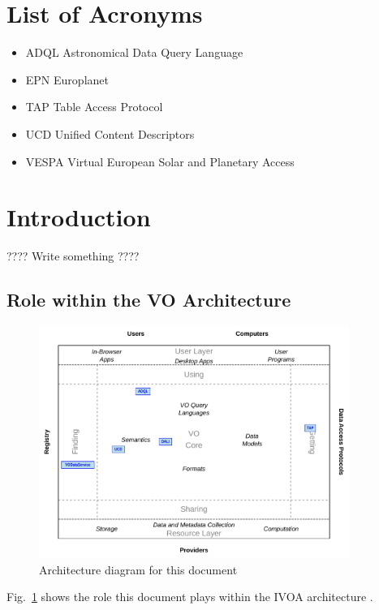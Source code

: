 \documentclass[11pt,a4paper]{ivoa}
\begin{document}
\section*{List of Acronyms}
\begin{itemize}
\item{ADQL} Astronomical Data Query Language
\item{EPN} Europlanet
\item{TAP} Table Access Protocol 
\item{UCD} Unified Content Descriptors
\item{VESPA} Virtual European Solar and Planetary Access
\end{itemize}

\section{Introduction}

???? Write something ????

\subsection{Role within the VO Architecture}

\begin{figure}[thb]
\centering

\includegraphics[width=0.9\textwidth]{role_diagram.pdf}
\caption{Architecture diagram for this document}
\label{fig:archdiag}
\end{figure}

Fig.~\ref{fig:archdiag} shows the role this document plays within the
IVOA architecture \citep{note:VOARCH}.
\end{document}
